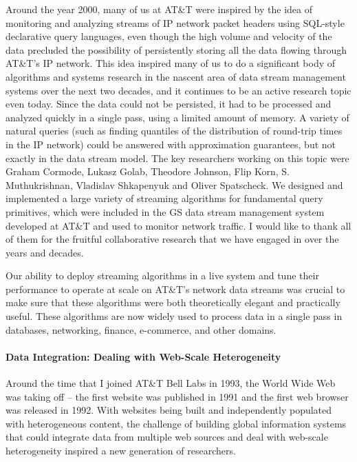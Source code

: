 \documentclass[11pt]{article}
\begin{document}
Around the year 2000, many of us at AT\&T were inspired by the idea of 
monitoring and analyzing streams of IP network packet headers 
using SQL-style declarative query languages, even though the high volume 
and velocity of the data precluded the possibility of persistently 
storing all the data flowing through AT\&T's IP network.
This idea inspired many of us to do a significant body of algorithms 
and systems research in the nascent area of data stream management 
systems over the next two decades, and it continues to be an active 
research topic even today.
Since the data could not be persisted, it had to be processed and 
analyzed quickly in a single pass, using a limited amount of memory.
A variety of natural queries (such as finding quantiles of the 
distribution of round-trip times in the IP network) could be 
answered with approximation guarantees, but not exactly in the data 
stream model.
The key researchers working on this topic were 
Graham Cormode, Lukasz Golab, Theodore Johnson, Flip Korn, 
S. Muthukrishnan, Vladislav Shkapenyuk and Oliver Spatscheck.
We designed and implemented a large variety of streaming algorithms
for fundamental query primitives, which were included in the GS 
data stream management
system developed at AT\&T and used to monitor network traffic.
I would like to thank all of them for the fruitful collaborative
research that we have engaged in over the years and decades.

Our ability to deploy streaming algorithms in a live system and tune 
their performance to operate at scale on AT\&T's network data streams
was crucial to make sure that these algorithms were both theoretically
elegant and practically useful.
These algorithms are now widely used to process data in a single pass 
in databases, networking, finance, e-commerce, and other domains.

\paragraph{Data Integration: Dealing with Web-Scale Heterogeneity}
Around the time that I joined AT\&T Bell Labs in 1993,
the World Wide Web was taking off -- the first website was published 
in 1991 and the first web browser was released in 1992.
With websites being built and independently populated with heterogeneous 
content, the challenge of building global 
information systems that could integrate data from multiple web sources 
and deal with web-scale heterogeneity inspired a new generation of 
researchers.
\end{document}
